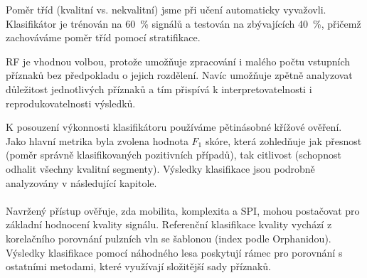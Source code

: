 Poměr tříd (kvalitní vs. nekvalitní) jsme při učení automaticky vyvažovli.
Klasifikátor je trénován na 60~\% signálů a testován na zbývajících 40~\%, přičemž zachováváme poměr tříd pomocí stratifikace. %

\acs{RF} je vhodnou volbou, protože umožňuje zpracování i malého počtu vstupních příznaků bez předpokladu o jejich rozdělení. %
Navíc umožňuje zpětně analyzovat důležitost jednotlivých příznaků a tím přispívá k interpretovatelnosti i reprodukovatelnosti výsledků.

K posouzení výkonnosti klasifikátoru používáme pětinásobné křížové ověření.
Jako hlavní metrika byla zvolena hodnota $F_1$ skóre, která zohledňuje jak přesnost (poměr správně klasifikovaných pozitivních případů), tak citlivost (schopnost odhalit všechny kvalitní segmenty).
Výsledky klasifikace jsou podrobně analyzovány v následující kapitole.

\paragraph{}
Navržený přístup ověřuje, zda mobilita, komplexita a SPI, mohou postačovat pro základní hodnocení kvality signálu.
Referenční klasifikace kvality vychází z korelačního porovnání pulzních vln se šablonou (index podle Orphanidou).
Výsledky klasifikace pomocí náhodného lesa poskytují rámec pro porovnání s ostatními metodami, které využívají složitější sady příznaků.
